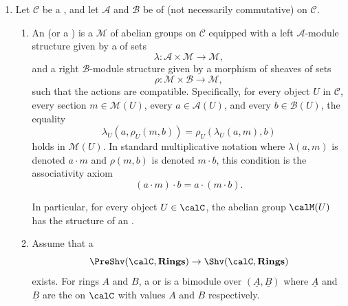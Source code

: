 \begin{definition} \label{definition:module_over_a_sheaf_of_rings_on_a_site}

    \begin{enumerate}
        \item 
        Let $\mathcal{C}$ be a , and let $\mathcal{A}$ and $\mathcal{B}$ be  of (not necessarily commutative)  on $\mathcal{C}$. 
        
        \begin{enumerate}
            \item 
            An  (or a ) is a  $\mathcal{M}$ of abelian groups on $\mathcal{C}$ equipped with a left $\mathcal{A}$-module structure given by a  of sets
            $$ \lambda: \mathcal{A} \times \mathcal{M} \longrightarrow \mathcal{M}, $$
            and a right $\mathcal{B}$-module structure given by a morphism of sheaves of sets
            $$ \rho: \mathcal{M} \times \mathcal{B} \longrightarrow \mathcal{M}, $$
            such that the actions are compatible. Specifically, for every object $U$ in $\mathcal{C}$, every section $m \in \mathcal{M}(U)$, every $a \in \mathcal{A}(U)$, and every $b \in \mathcal{B}(U)$, the equality
            $$ \lambda_U(a, \rho_U(m, b)) = \rho_U(\lambda_U(a, m), b) $$
            holds in $\mathcal{M}(U)$. In standard multiplicative notation where $\lambda(a,m)$ is denoted $a \cdot m$ and $\rho(m,b)$ is denoted $m \cdot b$, this condition is the associativity axiom
            $$ (a \cdot m) \cdot b = a \cdot (m \cdot b). $$

            In particular, for every object $U \in \calC$, the abelian group $\calM(U)$ has the structure of an .

            \item Assume that a  
            $$\PreShv(\calC, \mathbf{Rings}) \to \Shv(\calC, \mathbf{Rings})$$ 
            exists. For rings $A$ and $B$, a  or  is a bimodule over $(\underline{A}, \underline{B})$ where $\underline{A}$ and $\underline{B}$ are the  on $\calC$ with values $A$ and $B$ respectively.
            


\end{enumerate}
\end{enumerate}
\end{definition}
